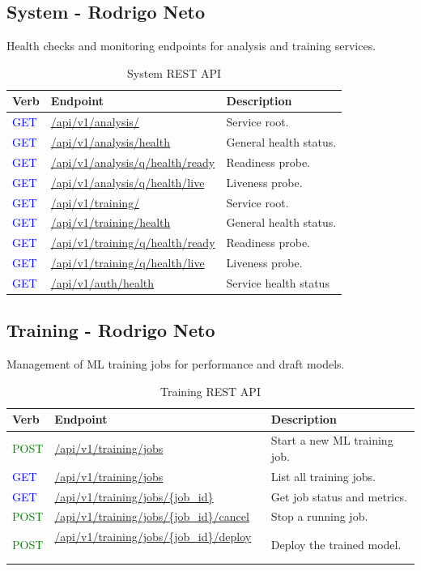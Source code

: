 \documentclass[11pt,a4paper]{article}
\newcommand{\postapi}{\textcolor{green}{POST}}
\newcommand{\getapi}{\textcolor{blue}{GET}}
\newcommand{\training}[1]{/api/v1/training#1}
\newcommand{\analysis}[1]{/api/v1/analysis#1}
\newcommand{\auth}[1]{/api/v1/auth#1}
\newcommand{\bff}[1]{\textbf{#1}}
\begin{document}
 \newpage
 \subsection{System - Rodrigo Neto}

 Health checks and monitoring endpoints for analysis and training services.

 \begin{table}[H]
 \begin{tabular}{|p{2cm}|p{5cm}|p{7cm}|}
 \hline
 \bff{Verb} & \bff{Endpoint}     & \bff{Description} \\ \hline
 \getapi & \url{\analysis/}    & Service root. \\ \hline
 \getapi & \url{\analysis/health}   & General health status. \\ \hline
 \getapi & \url{\analysis/q/health/ready} & Readiness probe. \\ \hline
 \getapi & \url{\analysis/q/health/live}  & Liveness probe. \\ \hline
 \getapi & \url{\training/}    & Service root. \\ \hline
 \getapi & \url{\training/health}   & General health status. \\ \hline
 \getapi & \url{\training/q/health/ready} & Readiness probe. \\ \hline
 \getapi & \url{\training/q/health/live}  & Liveness probe. \\ \hline
 \getapi & \url{\auth/health} &
 Service health status 
 \\ \hline
 \end{tabular}
 \caption{System REST API}
 \label{tab:api-system}
 \end{table}

 \subsection{Training - Rodrigo Neto}

 Management of ML training jobs for performance and draft models.

 \begin{table}[H]
 \begin{tabular}{|p{2cm}|p{5cm}|p{7cm}|}
 \hline
 \bff{Verb} & \bff{Endpoint}       & \bff{Description} \\ \hline
 \postapi & \url{\training/jobs}     & Start a new ML training job. \\ \hline
 \getapi & \url{\training/jobs}     & List all training jobs. \\ \hline
 \getapi & \url{\training/jobs/{job\_id}}   & Get job status and metrics. \\ \hline
 \postapi & \url{\training/jobs/{job\_id}/cancel}  & Stop a running job. \\ \hline
 \postapi & \url{\training/jobs/{job\_id}/deploy}  & Deploy the trained model. \\ \hline
 \end{tabular}
 \caption{Training REST API}
 \label{tab:api-training}
 \end{table}
\end{document}
